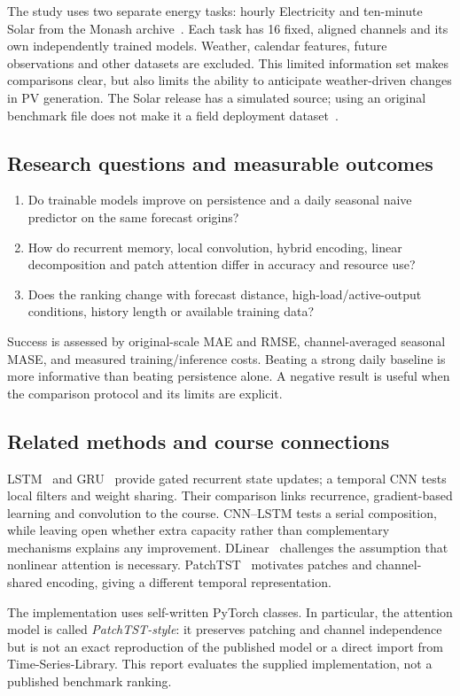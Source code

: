 \documentclass[10pt,a4paper]{article}
\begin{document}
The study uses two separate energy tasks: hourly Electricity and ten-minute Solar from the Monash archive~\cite{monash,electricity,solar}. Each task has 16 fixed, aligned channels and its own independently trained models. Weather, calendar features, future observations and other datasets are excluded. This limited information set makes comparisons clear, but also limits the ability to anticipate weather-driven changes in PV generation. The Solar release has a simulated source; using an original benchmark file does not make it a field deployment dataset~\cite{solar}.
\subsection{Research questions and measurable outcomes}
\begin{enumerate}
\item Do trainable models improve on persistence and a daily seasonal naive predictor on the same forecast origins?
\item How do recurrent memory, local convolution, hybrid encoding, linear decomposition and patch attention differ in accuracy and resource use?
\item Does the ranking change with forecast distance, high-load/active-output conditions, history length or available training data?
\end{enumerate}
Success is assessed by original-scale MAE and RMSE, channel-averaged seasonal MASE, and measured training/inference costs. Beating a strong daily baseline is more informative than beating persistence alone. A negative result is useful when the comparison protocol and its limits are explicit.
\subsection{Related methods and course connections}
LSTM~\cite{lstm} and GRU~\cite{gru} provide gated recurrent state updates; a temporal CNN tests local filters and weight sharing. Their comparison links recurrence, gradient-based learning and convolution to the course. CNN--LSTM tests a serial composition, while leaving open whether extra capacity rather than complementary mechanisms explains any improvement. DLinear~\cite{dlinear} challenges the assumption that nonlinear attention is necessary. PatchTST~\cite{patch} motivates patches and channel-shared encoding, giving a different temporal representation.

The implementation uses self-written PyTorch classes. In particular, the attention model is called \emph{PatchTST-style}: it preserves patching and channel independence but is not an exact reproduction of the published model or a direct import from Time-Series-Library. This report evaluates the supplied implementation, not a published benchmark ranking.
\end{document}
